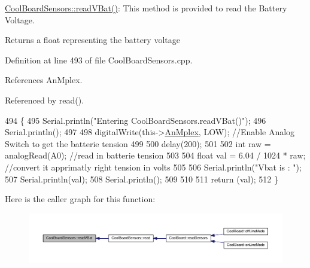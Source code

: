 \hyperlink{classCoolBoardSensors_a6944b6ea7bce8e2fce1b434acfd9d5f3}{Cool\+Board\+Sensors\+::read\+V\+Bat()}\+: This method is provided to read the Battery Voltage.

\begin{DoxyReturn}{Returns}
a float representing the battery voltage 
\end{DoxyReturn}


Definition at line 493 of file Cool\+Board\+Sensors.\+cpp.



References An\+Mplex.



Referenced by read().


\begin{DoxyCode}
494 \{
495     Serial.println(\textcolor{stringliteral}{"Entering CoolBoardSensors.readVBat()"});
496     Serial.println();
497 
498     digitalWrite(this->\hyperlink{classCoolBoardSensors_a12ef28b1046219e0aee10bf64e28c4a5}{AnMplex}, LOW);                            \textcolor{comment}{//Enable Analog Switch to get the
       batterie tension}
499     
500     delay(200);
501     
502     \textcolor{keywordtype}{int} raw = analogRead(A0);                                    \textcolor{comment}{//read in batterie tension}
503     
504     \textcolor{keywordtype}{float} val = 6.04 / 1024 * raw;                               \textcolor{comment}{//convert it apprimatly right tension in
       volts}
505     
506     Serial.println(\textcolor{stringliteral}{"Vbat is : "});
507     Serial.println(val);
508     Serial.println();
509 
510 
511     \textcolor{keywordflow}{return} (val);   
512 \}
\end{DoxyCode}
Here is the caller graph for this function\+:\nopagebreak
\begin{figure}[H]
\begin{center}
\leavevmode
\includegraphics[width=350pt]{classCoolBoardSensors_a6944b6ea7bce8e2fce1b434acfd9d5f3_icgraph}
\end{center}
\end{figure}
\mbox{\label{classCoolBoardSensors_a406307ffd70272282d91479c7ed8d66f}} 
